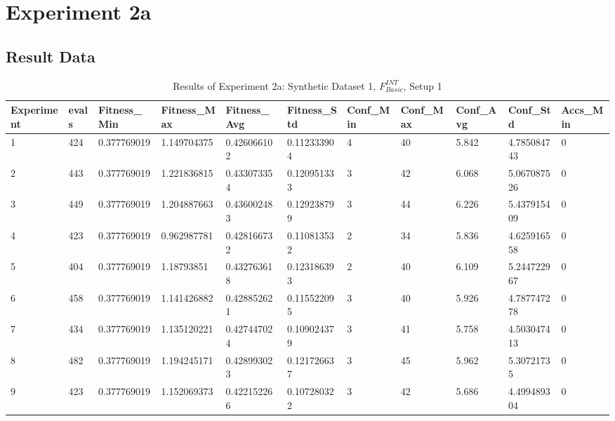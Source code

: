 \section{Experiment 2a}
\label{sec:A_Exp2a}
	\subsection{Result Data}
	\label{sec:A_Exp2a_Data}	
		\begin{table}[H]
		\caption{Results of Experiment 2a: Synthetic Dataset 1, $F_{Basic}^{INT}$, Setup 1}
		\label{tab:A_Exp2a_Data}
			\begin{adjustbox}{max width=380pt,keepaspectratio,angle=90}
				\begin{tabular}{|l|l|l|l|l|l|l|l|l|l|l|}
					\rowcolor[HTML]{EFEFEF} 
					\hline
					Experiment & evals & Fitness\_Min & Fitness\_Max & Fitness\_Avg & Fitness\_Std & Conf\_Min & Conf\_Max & Conf\_Avg & Conf\_Std   & Accs\_Min \\ \hline
					1          & 424   & 0.377769019  & 1.149704375  & 0.426066102  & 0.112333904  & 4         & 40        & 5.842     & 4.785084743 & 0         \\ \hline
					2          & 443   & 0.377769019  & 1.221836815  & 0.433073354  & 0.120951333  & 3         & 42        & 6.068     & 5.067087526 & 0         \\ \hline
					3          & 449   & 0.377769019  & 1.204887663  & 0.436002483  & 0.129238799  & 3         & 44        & 6.226     & 5.437915409 & 0         \\ \hline
					4          & 423   & 0.377769019  & 0.962987781  & 0.428166732  & 0.110813532  & 2         & 34        & 5.836     & 4.625916558 & 0         \\ \hline
					5          & 404   & 0.377769019  & 1.18793851   & 0.432763618  & 0.123186393  & 2         & 40        & 6.109     & 5.244722967 & 0         \\ \hline
					6          & 458   & 0.377769019  & 1.141426882  & 0.428852621  & 0.115522095  & 3         & 40        & 5.926     & 4.787747278 & 0         \\ \hline
					7          & 434   & 0.377769019  & 1.135120221  & 0.427447024  & 0.109024379  & 3         & 41        & 5.758     & 4.503047413 & 0         \\ \hline
					8          & 482   & 0.377769019  & 1.194245171  & 0.428993023  & 0.121726637  & 3         & 45        & 5.962     & 5.30721735  & 0         \\ \hline
					9          & 423   & 0.377769019  & 1.152069373  & 0.422152266  & 0.107280322  & 3         & 42        & 5.686     & 4.499489304 & 0         \\ \hline

\end{tabular}
\end{adjustbox}
\end{table}
